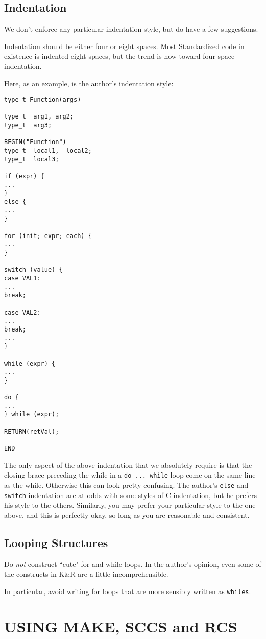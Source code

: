 \subsection{Indentation}
We don't enforce any particular indentation style, but do have a few
suggestions.

Indentation should be either four or eight spaces.  Most Standardized
code in existence is indented eight spaces, but the trend is now
toward four-space indentation.

Here, as an example, is the author's indentation style:
\begin{verbatim}
type_t Function(args)

type_t  arg1, arg2;
type_t  arg3;

BEGIN("Function")
type_t  local1,  local2;
type_t  local3;

if (expr) {
...
}
else {
...
}

for (init; expr; each) {
...
}

switch (value) {
case VAL1:
...
break;

case VAL2:
...
break;
...
}

while (expr) {
...
}

do {
...
} while (expr);

RETURN(retVal);

END
\end{verbatim}

The only aspect of the above indentation that we absolutely require is
that the closing brace preceding the while in a {\tt do ... while}
loop come on the same line as the while.  Otherwise this can look
pretty confusing.  The author's {\tt else} and {\tt switch}
indentation are at odds with some styles of C indentation, but he
prefers his style to the others.  Similarly, you may prefer your
particular style to the one above, and this is perfectly okay, so long
as you are reasonable and consistent.

\subsection{Looping Structures}
Do {\em not} construct ``cute" for and while loops.  In the author's
opinion, even some of the constructs in K\&R are a little
incomprehensible.

In particular, avoid writing for loops that are more sensibly written as
{\tt whiles}.

\section{USING MAKE, SCCS and RCS}
